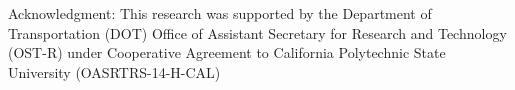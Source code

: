 \vspace*{\fill}
\noindent Acknowledgment: This research was supported by the Department of Transportation (DOT) Office of Assistant Secretary for Research and Technology (OST-R) under Cooperative Agreement to California Polytechnic State University (OASRTRS-14-H-CAL)

